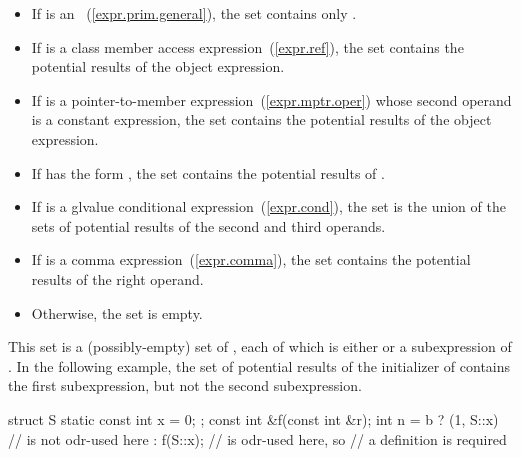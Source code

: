 \begin{itemize}
\item If  is an
~(\ref{expr.prim.general}), the set
contains only .
\item If  is a class member access
expression~(\ref{expr.ref}), the set contains the potential results of
the object expression.
\item If  is a pointer-to-member
expression~(\ref{expr.mptr.oper}) whose second operand is a constant
expression, the set contains the potential results of the object
expression.
\item If  has the form , the set contains the
potential results of .
\item If  is a glvalue conditional
expression~(\ref{expr.cond}), the set is the union of the sets of
potential results of the second and third operands.
\item If  is a comma expression~(\ref{expr.comma}), the set
contains the potential results of the right operand.
\item Otherwise, the set is empty.
\end{itemize}
\enternote
This set is a (possibly-empty) set of ,
each of which is either  or a subexpression of .
\enterexample
In the following example, the set of potential results of the initializer
of  contains the first  subexpression, but not the second
 subexpression.
\begin{codeblock}
struct S { static const int x = 0; };
const int &f(const int &r);
int n = b ? (1, S::x)  //  is not odr-used here
          : f(S::x);   //  is odr-used here, so
                       // a definition is required
\end{codeblock}
\exitexample
\exitnote

